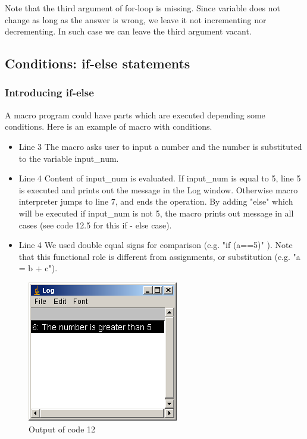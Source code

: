 Note that the third argument of for-loop is missing. Since variable
 does not change as long as the answer is wrong, we leave it not
incrementing nor decrementing. In such case we can leave the third argument
vacant. 

\subsection{Conditions: if-else statements}
\subsubsection{Introducing if-else}
A macro program could have parts which are executed depending some
conditions.
Here is an example of macro with conditions.

\begin{itemize}
\item Line 3 The macro asks user to input a number and the number is substituted to the variable input\_num.
\item Line 4 Content of input\_num is evaluated. If input\_num is equal to 5, line 5 is executed and prints out the message in the Log window. Otherwise macro interpreter jumps to line 7, and ends the operation.  By adding "else" which will be executed if input\_num is not 5, the macro prints out message in all cases (see code 12.5 for this if - else case). 
\item Line 4 We used double equal signs for comparison (e.g. "if (a==5)"
). Note that this functional role is different from assignments, or substitution (e.g. "a = b + c").
\end{itemize}
\begin{figure}[htbp]
\begin{center}
\includegraphics[scale=0.6]{fig/fig2341_code12out.png}
\caption{Output of code 12}
\label{fig:code12 output}
\end{center}
\end{figure} 

